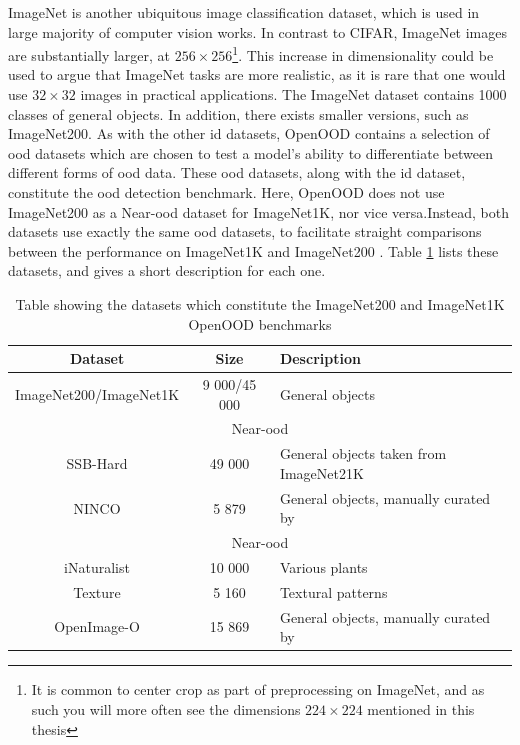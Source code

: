 \documentclass[UKenglish]{uiomasterthesis} %
\theoremstyle{definition}
\begin{document}
ImageNet is another ubiquitous image classification dataset, which is used in large majority of computer vision works. In contrast to CIFAR, ImageNet images are substantially larger, at $256 \times 256$\footnote{It is common to center crop as part of preprocessing on ImageNet, and as such you will more often see the dimensions $224 \times 224$ mentioned in this thesis}. This increase in dimensionality could be used to argue that ImageNet tasks are more realistic, as it is rare that one would use $32 \times 32$ images in practical applications. The ImageNet dataset contains 1000 classes of general objects. In addition, there exists smaller versions, such as ImageNet200. As with the other \ac{id} datasets, OpenOOD contains a selection of \ac{ood} datasets which are chosen to test a model's ability to differentiate between different forms of \ac{ood} data. These \ac{ood} datasets, along with the \ac{id} dataset, constitute the \ac{ood} detection benchmark. Here, OpenOOD does not use ImageNet200 as a Near-\ac{ood} dataset for ImageNet1K, nor vice versa.Instead, both datasets use exactly the same \ac{ood} datasets, to facilitate straight comparisons between the performance on ImageNet1K and ImageNet200 \cite{openood15}. Table \ref{table:imagenet200} lists these datasets, and gives a short description for each one.

\begin{table}[h]
\begin{center}
\begin{tabular}{ |c|c|l| } 
    \hline
    Dataset & Size & Description \\
    \hline
    \rowcolor{id!50}
    ImageNet200/ImageNet1K & 9 000/45 000 & General objects \\ 
    \hline
    \hline
    \multicolumn{3}{|c|}{Near-\ac{ood}} \\
    \hline
    \rowcolor{near!50}
    SSB-Hard & 49 000 & General objects taken from ImageNet21K \\ 
    \rowcolor{near!50}
    NINCO & 5 879 & General objects, manually curated by \cite{bitterwolf2023ninco} \\ 
    \hline
    \hline
    \multicolumn{3}{|c|}{Near-\ac{ood}} \\
    \hline
    \rowcolor{far!50}
    iNaturalist & 10 000 & Various plants \\ 
    \rowcolor{far!50}
    Texture & 5 160 & Textural patterns \\ 
    \rowcolor{far!50}
    OpenImage-O & 15 869 & General objects, manually curated by \cite{vim} \\ 
    \hline
    \end{tabular}
    \caption[ImageNet benchmark datasets]{Table showing the datasets which constitute the ImageNet200 and ImageNet1K OpenOOD benchmarks}
    \label{table:imagenet200}
\end{center}
\end{table}
\end{document}
